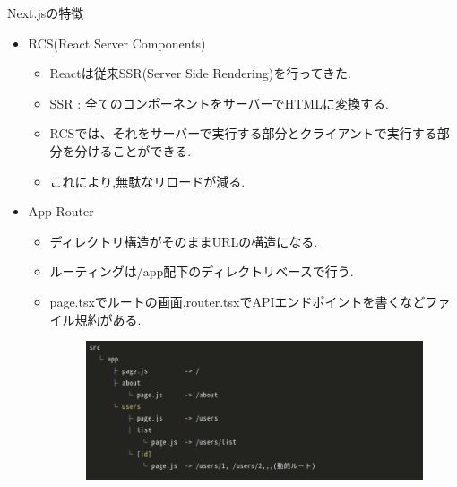 \documentclass[aspectratio=169]{beamer}
\begin{document}
\begin{frame}[allowframebreaks]{Next.jsの特徴}
    \begin{itemize}
        \item RCS(React Server Components)
        \begin{itemize}
             \setlength{\itemsep}{2em}
            \item Reactは従来SSR(Server Side Rendering)を行ってきた.
            \item SSR : 全てのコンポーネントをサーバーでHTMLに変換する.
            \item RCSでは、それをサーバーで実行する部分とクライアントで実行する部分を分けることができる.
            \item これにより,無駄なリロードが減る.
        \end{itemize}
        \newpage
        \item App Router
        \begin{itemize}
            \item ディレクトリ構造がそのままURLの構造になる.
            \item ルーティングは/app配下のディレクトリベースで行う.
            \item page.tsxでルートの画面,router.tsxでAPIエンドポイントを書くなどファイル規約がある.
            \begin{figure}
                \includegraphics[scale=0.35]{AppRouter.png}
            \end{figure}
        \end{itemize}
    \end{itemize}
\end{frame}
\end{document}
